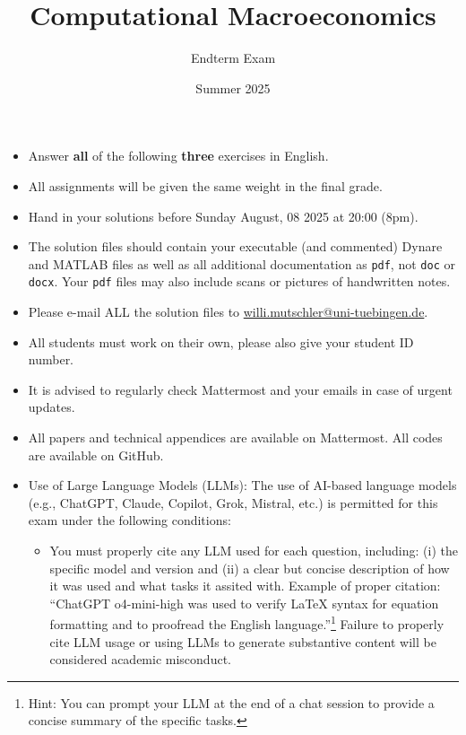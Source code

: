 \documentclass{article}
\numberwithin{equation}{section}
\begin{document}
\title{Computational Macroeconomics}
\author{Endterm Exam}
\date{Summer 2025}
\maketitle


\begin{itemize}
\item
Answer \textbf{all} of the following \textbf{three} exercises in English.
\item
All assignments will be given the same weight in the final grade.
\item
Hand in your solutions before Sunday August, 08 2025 at 20:00 (8pm).
\item
The solution files should contain your executable (and commented) Dynare and MATLAB files
  as well as all additional documentation as \texttt{pdf}, not \texttt{doc} or \texttt{docx}.
Your \texttt{pdf} files may also include scans or pictures of handwritten notes.
\item
Please e-mail ALL the solution files to \url{willi.mutschler@uni-tuebingen.de}.
\item
All students must work on their own, please also give your student ID number.
\item
It is advised to regularly check Mattermost and your emails in case of urgent updates.
\item
All papers and technical appendices are available on Mattermost.
All codes are available on GitHub.
\item Use of Large Language Models (LLMs): The use of AI-based language models (e.g., ChatGPT, Claude, Copilot, Grok, Mistral, etc.) is permitted for this exam under the following conditions:
  \begin{itemize}
    \item You must properly cite any LLM used for each question,
      including: (i) the specific model and version and (ii) a clear but concise description of how it was used and what tasks it assited with.
    Example of proper citation: ``ChatGPT o4-mini-high was used to verify LaTeX syntax for equation formatting and to proofread the English language.''\footnote{%
    Hint: You can prompt your LLM at the end of a chat session to provide a concise summary of the specific tasks.}
    Failure to properly cite LLM usage or using LLMs to generate substantive content will be considered academic misconduct.
    

\end{itemize}
\end{itemize}
\end{document}
